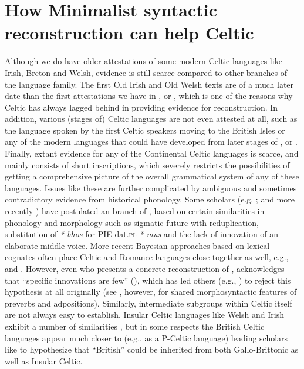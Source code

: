 \documentclass[output=paper,colorlinks,citecolor=brown]{langscibook}
\begin{document}
\section{How Minimalist syntactic reconstruction can help Celtic}
\label{sec:MinhelpCeltic}

\noindent Although we do have older attestations of some modern Celtic languages like Irish, Breton and Welsh, evidence is still scarce compared to other branches of the  language family. The first Old Irish and Old Welsh texts are of a much later date than the first attestations we have in ,  or , which is one of the reasons why Celtic has always lagged behind in providing evidence for  reconstruction. In addition, various (stages of) Celtic languages are not even attested at all, such as the language spoken by the first Celtic speakers moving to the British Isles or any of the modern languages that could have developed from later stages of ,  or . Finally, extant evidence for any of the Continental Celtic languages is scarce, and mainly consists of short inscriptions, which severely restricts the possibilities of getting a comprehensive picture of the overall grammatical system of any of these languages. Issues like these are further complicated by ambiguous and sometimes contradictory evidence from historical phonology. Some scholars (e.g. \citealt{mm:kortlandt_italo-celtic_2007}; \citealt{mm:schrijver_studies_1997} and more recently \citealt{mm:weiss2022}) have postulated an  branch of , based on certain similarities in phonology and morphology such as sigmatic future with reduplication, substitution of \textit{*-bhos} for PIE dat.\textsc{pl} \textit{*-mus} and the lack of innovation of an elaborate middle voice. More recent Bayesian approaches based on lexical cognates often place Celtic and Romance languages close together as well, e.g., \citet[215]{mm:atkinson_qd_curious_2005} and \citet[7]{mm:neureiter2022detecting}. However, even \citet{mm:kortlandt_italo-celtic_2007} who presents a concrete reconstruction of , acknowledges that ``specific  innovations are few'' (\cite[157]{mm:kortlandt_italo-celtic_2007}), which has led others (e.g., \citealt{mm:watkins_origin_1966}) to reject this  hypothesis at all originally (see \citealt{mm:weissforth}, however, for shared morphosyntactic features of preverbs and adpositions). Similarly, intermediate subgroups within Celtic itself are not always easy to establish. Insular Celtic languages like Welsh and Irish exhibit a number of similarities \citep[463--465]{mm:schrijver_studies_1995}, but in some respects the British Celtic languages appear much closer to  (e.g., as a P-Celtic language) leading scholars like \citet{mm:sims-williams_celtic_2003} to hypothesize that “British” could be inherited from both Gallo\hyp Brittonic as well as Insular Celtic.
\end{document}
